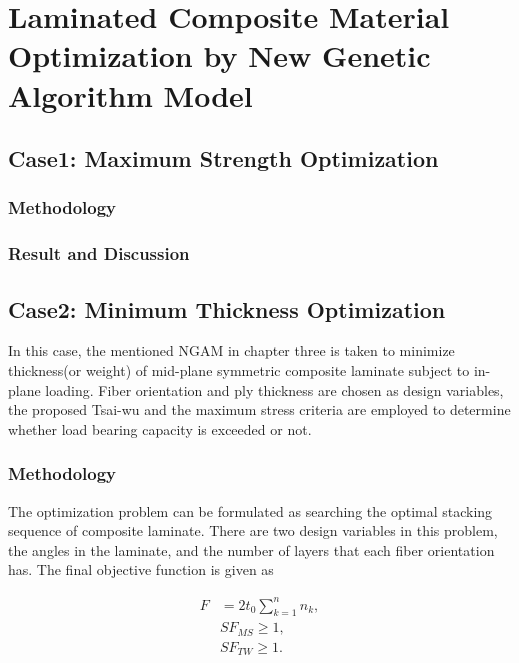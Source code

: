 
\chapter{Laminated Composite Material Optimization by New Genetic Algorithm Model} %

\label{Chapter4} %


\section{Case1: Maximum Strength Optimization}




\subsection{Methodology}

\subsection{Result and Discussion}

\section{Case2: Minimum Thickness Optimization}
In this case, the mentioned NGAM in chapter three is taken to minimize thickness(or
weight) of mid-plane symmetric composite laminate subject to in-plane loading.
Fiber orientation and ply thickness are chosen as design variables, the proposed
Tsai-wu and the maximum stress criteria are employed to determine whether
load bearing capacity is exceeded or not.

\subsection{Methodology}

The optimization problem can be formulated as searching the optimal stacking
sequence of composite laminate. There are two design variables in this problem,
the angles in the laminate, and the number of layers that each fiber orientation
has. The final objective function is given as

\begin{equation}
	\begin{split}
    	F  &= 2t_0 \sum_{k=1}^n n_k  \textstyle{,}\\
    	   &SF_{MS} \geq 1 \textstyle{,} \\
    	   &SF_{TW} \geq 1 \textstyle{.}
	\end{split} 
\end{equation}

